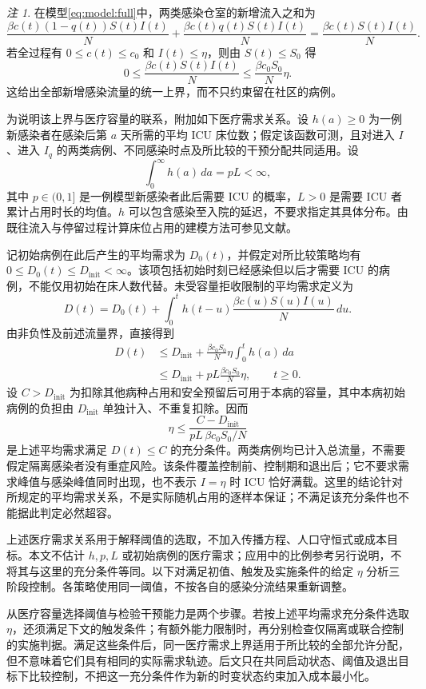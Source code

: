 \documentclass[UTF8,a4paper,zihao=-4,fontset=fandol]{ctexart}
\theoremstyle{remark}
\newtheorem*{remark}{注}
\begin{document}
\begin{remark}
在模型\eqref{eq:model:full}中，两类感染仓室的新增流入之和为
\[
\frac{\beta c(t)(1-q(t))S(t)I(t)}{N}
+\frac{\beta c(t)q(t)S(t)I(t)}{N}
=\frac{\beta c(t)S(t)I(t)}{N}.
\]
若全过程有 $0\le c(t)\le c_0$ 和 $I(t)\le\eta$，则由 $S(t)\le S_0$ 得
\[
0\le\frac{\beta c(t)S(t)I(t)}{N}
\le\frac{\beta c_0S_0}{N}\eta.
\]
这给出全部新增感染流量的统一上界，而不只约束留在社区的病例。

为说明该上界与医疗容量的联系，附加如下医疗需求关系。设 $h(a)\ge0$ 为一例新感染者在感染后第 $a$ 天所需的平均 ICU 床位数；假定该函数可测，且对进入 $I$、进入 $I_q$ 的两类病例、不同感染时点及所比较的干预分配共同适用。设
\[
\int_0^\infty h(a)\,da=pL<\infty,
\]
其中 $p\in(0,1]$ 是一例模型新感染者此后需要 ICU 的概率，$L>0$ 是需要 ICU 者累计占用时长的均值。$h$ 可以包含感染至入院的延迟，不要求指定其具体分布。由既往流入与停留过程计算床位占用的建模方法可参见文献\cite{Baas2021Occupancy}。

记初始病例在此后产生的平均需求为 $D_0(t)$，并假定对所比较策略均有 $0\le D_0(t)\le D_{\mathrm{init}}<\infty$。该项包括初始时刻已经感染但以后才需要 ICU 的病例，不能仅用初始在床人数代替。未受容量拒收限制的平均需求定义为
\[
D(t)=D_0(t)+\int_0^t h(t-u)
\frac{\beta c(u)S(u)I(u)}{N}\,du.
\]
由非负性及前述流量界，直接得到
\[
\begin{aligned}
D(t)
&\le D_{\mathrm{init}}+
\frac{\beta c_0S_0}{N}\eta\int_0^t h(a)\,da\\
&\le D_{\mathrm{init}}+pL\frac{\beta c_0S_0}{N}\eta,
\qquad t\ge0.
\end{aligned}
\]
设 $C>D_{\mathrm{init}}$ 为扣除其他病种占用和安全预留后可用于本病的容量，其中本病初始病例的负担由 $D_{\mathrm{init}}$ 单独计入、不重复扣除。因而
\[
\eta\le\frac{C-D_{\mathrm{init}}}{pL\,\beta c_0S_0/N}
\]
是上述平均需求满足 $D(t)\le C$ 的充分条件。两类病例均已计入总流量，不需要假定隔离感染者没有重症风险。该条件覆盖控制前、控制期和退出后；它不要求需求峰值与感染峰值同时出现，也不表示 $I=\eta$ 时 ICU 恰好满载。这里的结论针对所规定的平均需求关系，不是实际随机占用的逐样本保证；不满足该充分条件也不能据此判定必然超容。
\end{remark}

上述医疗需求关系用于解释阈值的选取，不加入传播方程、人口守恒式或成本目标。本文不估计 $h,p,L$ 或初始病例的医疗需求；应用中的比例参考另行说明，不将其与这里的充分条件等同。以下对满足初值、触发及实施条件的给定 $\eta$ 分析三阶段控制。各策略使用同一阈值，不按各自的感染分流结果重新调整。

\medskip
从医疗容量选择阈值与检验干预能力是两个步骤。若按上述平均需求充分条件选取 $\eta$，还须满足下文的触发条件；有额外能力限制时，再分别检查仅隔离或联合控制的实施判据。满足这些条件后，同一医疗需求上界适用于所比较的全部允许分配，但不意味着它们具有相同的实际需求轨迹。后文只在共同启动状态、阈值及退出目标下比较控制，不把这一充分条件作为新的时变状态约束加入成本最小化。
\clearpage
\end{document}
